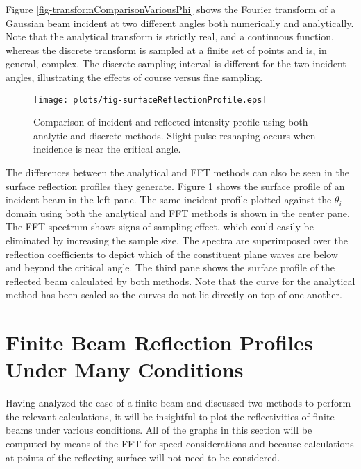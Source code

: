 \documentclass[12pt]{uthesis-v12}
\begin{document}
Figure \ref{fig-transformComparisonVariousPhi} shows the Fourier transform of a Gaussian beam incident at two different angles both numerically and analytically. Note that the analytical transform is strictly real, and a continuous function, whereas the discrete transform is sampled at a finite set of points and is, in general, complex. The discrete sampling interval is different for the two incident angles, illustrating the effects of course versus fine sampling.

\begin{figure}
\centering
\texttt{[image: plots/fig-surfaceReflectionProfile.eps]}
\caption[Intensity profile of incident and reflected Guassian beams]{Comparison of incident and reflected intensity profile using both analytic and discrete methods. Slight pulse reshaping occurs when incidence is near the critical angle.
 \label{fig-surfaceReflectionProfile}}
\end{figure}

The differences between the analytical and FFT methods can also be seen in the surface reflection profiles they generate.  Figure \ref{fig-surfaceReflectionProfile} shows the surface profile of an incident beam in the left pane. The same incident profile plotted against the $\theta_i$ domain using both the analytical and FFT methods is shown in the center pane. The FFT spectrum shows signs of sampling effect, which could easily be eliminated by increasing the sample size. The spectra are superimposed over the reflection coefficients to depict which of the constituent plane waves are below and beyond the critical angle. The third pane shows the surface profile of the reflected beam calculated by both methods. Note that the curve for the analytical method has been scaled so the curves do not lie directly on top of one another.

\section{Finite Beam Reflection Profiles Under Many Conditions}\label{finiteBeam-variousConditions}

Having analyzed the case of a finite beam and discussed two methods to perform the relevant calculations, it will be insightful to plot the reflectivities of finite beams under various conditions. All of the graphs in this section will be computed by means of the FFT for speed considerations and because calculations at points of the reflecting surface will not need to be considered.
\end{document}
